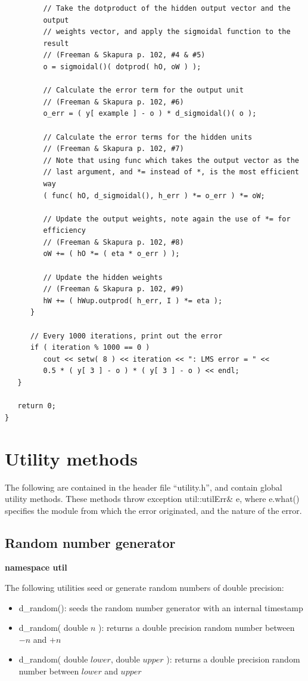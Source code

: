 \documentclass{report}
\begin{document}
\begin{verbatim}
         // Take the dotproduct of the hidden output vector and the
         output
         // weights vector, and apply the sigmoidal function to the
         result
         // (Freeman & Skapura p. 102, #4 & #5)
         o = sigmoidal()( dotprod( hO, oW ) );

         // Calculate the error term for the output unit
         // (Freeman & Skapura p. 102, #6)
         o_err = ( y[ example ] - o ) * d_sigmoidal()( o );

         // Calculate the error terms for the hidden units
         // (Freeman & Skapura p. 102, #7)
         // Note that using func which takes the output vector as the
         // last argument, and *= instead of *, is the most efficient
         way
         ( func( hO, d_sigmoidal(), h_err ) *= o_err ) *= oW;

         // Update the output weights, note again the use of *= for
         efficiency
         // (Freeman & Skapura p. 102, #8)
         oW += ( hO *= ( eta * o_err ) );

         // Update the hidden weights
         // (Freeman & Skapura p. 102, #9)
         hW += ( hWup.outprod( h_err, I ) *= eta );
      }

      // Every 1000 iterations, print out the error
      if ( iteration % 1000 == 0 )
         cout << setw( 8 ) << iteration << ": LMS error = " <<
         0.5 * ( y[ 3 ] - o ) * ( y[ 3 ] - o ) << endl;
   }

   return 0;
}
\end{verbatim}

\chapter{Utility methods}

The following are contained in the header file ``utility.h'', and
contain global utility methods.  These methods throw exception
util::utilErr\& e, where e.what() specifies the module from which the
error originated, and the nature of the error.

\section{Random number generator}

{\bf namespace util}

The following utilities seed or generate random numbers of double
precision:

\begin{itemize}
\item d\_random(): seeds the random number generator with an internal
      timestamp
\item d\_random( double $n$ ): returns a double precision random
      number between $-n$ and $+n$
\item d\_random( double $lower$, double $upper$ ): returns a double
      precision random number between $lower$ and $upper$
\end{itemize}
\end{document}
